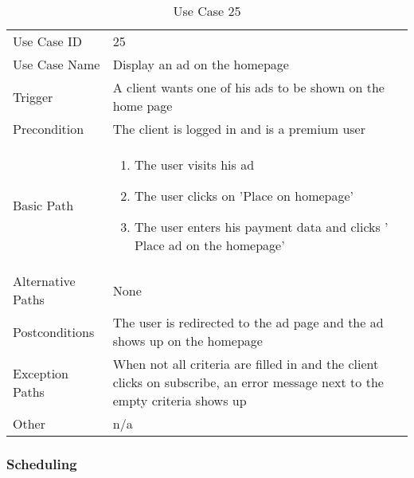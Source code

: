 \begin{table}[H]
\centering
\label{table-use-case-25}
\begin{tabular}{|p{3cm}|p{10cm}}
Use Case ID       & 25                                                           
\\
Use Case Name     & Display an ad on the homepage                                                          
\\
Trigger           & A client wants one of his ads to be shown on the home page
\\
Precondition      & The client is logged in and is a premium user                                                
\\
Basic Path        & \begin{enumerate}
\item The user visits his ad
\item The user clicks on 'Place on homepage'
\item The user enters his payment data and clicks ' Place ad on the homepage'
\end{enumerate} 
     \\
Alternative Paths & None                          \\
Postconditions    & The user is redirected to the ad page and the ad shows up on the homepage                                                          
\\
Exception Paths   & When not all criteria are filled in and the client clicks on
subscribe, an error message next to the empty criteria shows up
\\
Other             & n/a                                                                                                                                                                                                        
\end{tabular}
\caption{Use Case 25}
\end{table}


\subsubsection{Scheduling}


